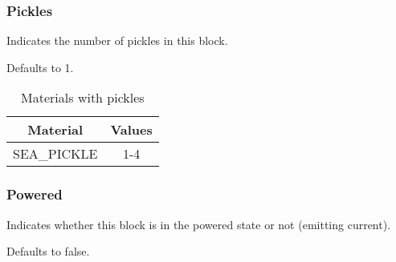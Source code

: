 \subsubsection{Pickles}
Indicates the number of pickles in this block.

Defaults to 1.

\begin{table}[H]
	\centering
	\begin{tabular}{ |c|c| }
		\hline
		Material & Values \\
		\hline
		SEA\_PICKLE & 1-4 \\
		\hline
	\end{tabular}
	\caption{Materials with pickles}
\end{table}


\subsubsection{Powered}
Indicates whether this block is in the powered state or not (emitting current).

Defaults to false.

